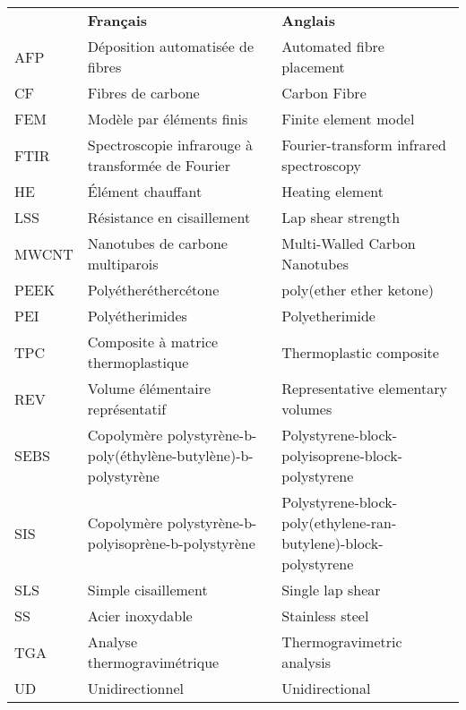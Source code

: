 \begin{longtable}{p{0.75in}>{\raggedright\arraybackslash}p{2.5in} p{2.5in}}
	      & \textbf{Français}                                              & \textbf{Anglais}                                                \\
	AFP   & Déposition automatisée de fibres                               & Automated fibre placement                                       \\
	CF    & Fibres de carbone                                              & Carbon Fibre                                                    \\
	FEM   & Modèle par éléments finis                                      & Finite element model                                            \\
	FTIR  & Spectroscopie infrarouge à transformée de Fourier              & Fourier-transform infrared spectroscopy                         \\
	HE    & Élément chauffant                                              & Heating element                                                 \\
	LSS   & Résistance en cisaillement                                     & Lap shear strength                                              \\
	MWCNT & Nanotubes de carbone multiparois                               & Multi-Walled Carbon Nanotubes                                   \\
	PEEK  & Polyétheréthercétone                                           & poly(ether ether ketone)                                        \\
	PEI   & Polyétherimides                                                & Polyetherimide                                                  \\
	TPC   & Composite à matrice thermoplastique                            & Thermoplastic composite                                         \\
	REV   & Volume élémentaire représentatif                               & Representative elementary volumes                               \\
	SEBS  & Copolymère polystyrène-b-poly(éthylène-butylène)-b-polystyrène & Polystyrene-block-polyisoprene-block-polystyrene                \\
	SIS   & Copolymère polystyrène-b-polyisoprène-b-polystyrène            & Polystyrene-block-poly(ethylene-ran-butylene)-block-polystyrene \\
	SLS   & Simple cisaillement                                            & Single lap shear                                                \\
	SS    & Acier inoxydable                                               & Stainless steel                                                 \\
	TGA   & Analyse thermogravimétrique                                    & Thermogravimetric analysis                                      \\
	UD    & Unidirectionnel                                                & Unidirectional
\end{longtable}
